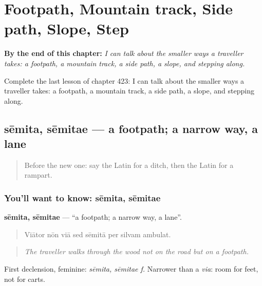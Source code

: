
\chapter{Footpath, Mountain track, Side path, Slope, Step}
\label{ch:la-footpath-mountain-track-side-path-slope-step}

\begin{chapteropening}
\textbf{By the end of this chapter:} \emph{I can talk about the smaller ways a traveller takes: a footpath, a mountain track, a side path, a slope, and stepping along.}

Complete the last lesson of chapter 423: I can talk about the smaller ways a traveller takes: a footpath, a mountain track, a side path, a slope, and stepping along.
\end{chapteropening}

\section[sēmita, sēmitae]{sēmita, sēmitae — a footpath; a narrow way, a lane}

\label{lesson:LA-C423-semita}



\begin{quote}
Before the new one: say the Latin for a ditch, then the Latin for a rampart.
\end{quote}

\subsection*{You'll want to know: sēmita, sēmitae}
\textbf{sēmita, sēmitae} — \textquotedblleft{}a footpath; a narrow way, a lane\textquotedblright{}.

\begin{quote}
Viātor nōn viā sed sēmitā per silvam ambulat.
\end{quote}

\begin{quote}
\emph{The traveller walks through the wood not on the road but on a footpath.}
\end{quote}

First declension, feminine: \emph{sēmita, sēmitae f.} Narrower than a \emph{via}: room for feet, not for carts.

